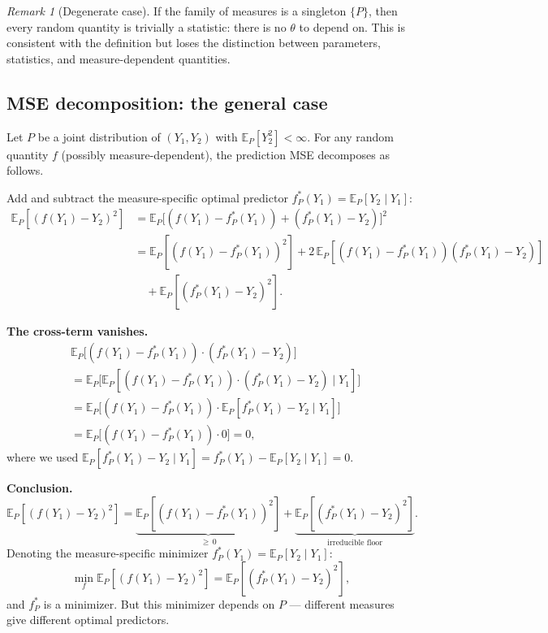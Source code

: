 \documentclass[a4paper,oneside,12pt]{extarticle}
\theoremstyle{plain}
\theoremstyle{definition}
\theoremstyle{remark}
\newtheorem{remark}[proposition]{Remark}
\newcommand*{\E}{\mathbb{E}}
\begin{document}
\begin{remark}[Degenerate case]
If the family of measures is a singleton $\{P\}$, then every random
quantity is trivially a statistic: there is no $\theta$ to depend on.
This is consistent with the definition but loses the distinction between
parameters, statistics, and measure-dependent quantities.
\end{remark}

\subsection{MSE decomposition: the general case}

Let $P$ be a joint distribution of $(Y_1, Y_2)$ with $\E_P[Y_2^2]<\infty$.
For any random quantity $f$ (possibly measure-dependent), the prediction
MSE decomposes as follows.

Add and subtract the measure-specific optimal predictor
$f_P^*(Y_1) = \E_P[Y_2 \mid Y_1]$:
\begin{align*}
\E_P[(f(Y_1)-Y_2)^2]
&= \E_P\bigl[(f(Y_1)-f_P^*(Y_1)) + (f_P^*(Y_1)-Y_2)\bigr]^2 \\
&= \E_P[(f(Y_1)-f_P^*(Y_1))^2]
  + 2\,\E_P[(f(Y_1)-f_P^*(Y_1))(f_P^*(Y_1)-Y_2)] \\
&\quad + \E_P[(f_P^*(Y_1)-Y_2)^2].
\end{align*}

\textbf{The cross-term vanishes.}
\begin{align*}
&\E_P\bigl[(f(Y_1)-f_P^*(Y_1))\cdot(f_P^*(Y_1)-Y_2)\bigr] \\
&= \E_P\bigl[\E_P[(f(Y_1)-f_P^*(Y_1))\cdot(f_P^*(Y_1)-Y_2)\mid Y_1]\bigr] \\
&= \E_P\bigl[(f(Y_1)-f_P^*(Y_1))\cdot\E_P[f_P^*(Y_1)-Y_2 \mid Y_1]\bigr] \\
&= \E_P\bigl[(f(Y_1)-f_P^*(Y_1))\cdot 0\bigr] = 0,
\end{align*}
where we used $\E_P[f_P^*(Y_1)-Y_2 \mid Y_1]
= f_P^*(Y_1) - \E_P[Y_2\mid Y_1] = 0$.

\textbf{Conclusion.}
\begin{equation}
\label{eq:mse_decomp}
\E_P[(f(Y_1)-Y_2)^2]
= \underbrace{\E_P[(f(Y_1)-f_P^*(Y_1))^2]}_{\geq\,0}
+ \underbrace{\E_P[(f_P^*(Y_1)-Y_2)^2]}_{\text{irreducible floor}}.
\end{equation}
Denoting the measure-specific minimizer $f_P^*(Y_1) = \E_P[Y_2 \mid Y_1]$:
\[
  \min_f \E_P[(f(Y_1)-Y_2)^2] = \E_P[(f_P^*(Y_1)-Y_2)^2],
\]
and $f_P^*$ is a minimizer. But this minimizer depends on $P$ ---
different measures give different optimal predictors.
\end{document}
